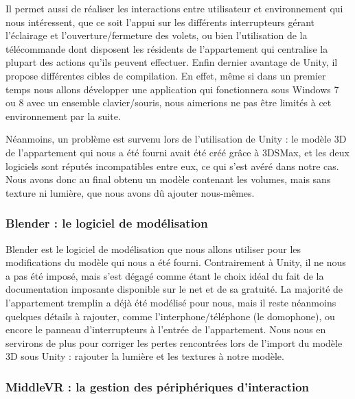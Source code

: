 Il permet aussi de réaliser les interactions entre utilisateur et environnement qui nous intéressent, que ce soit l'appui sur les différents interrupteurs gérant l'éclairage et l'ouverture/fermeture des volets, ou bien l'utilisation de la télécommande dont disposent les résidents de l'appartement qui centralise la plupart des actions qu'ils peuvent effectuer.
Enfin dernier avantage de Unity, il propose différentes cibles de compilation. En effet, même si dans un premier temps nous allons développer une application qui fonctionnera sous Windows 7 ou 8 avec un ensemble clavier/souris, nous aimerions ne pas être limités à cet environnement par la suite. \newline

Néanmoins, un problème est survenu lors de l'utilisation de Unity : le modèle 3D de l'appartement qui nous a été fourni avait été créé grâce à 3DSMax, et les deux logiciels sont réputés incompatibles entre eux, ce qui s'est avéré dans notre cas. Nous avons donc au final obtenu un modèle contenant les volumes, mais sans texture ni lumière, que nous avons dû ajouter nous-mêmes. 

\subsubsection{Blender : le logiciel de modélisation}
Blender est le logiciel de modélisation que nous allons utiliser pour les modifications du modèle qui nous a été fourni. Contrairement à Unity, il ne nous a pas été imposé, mais s'est dégagé comme étant le choix idéal du fait de la documentation imposante disponible sur le net et de sa gratuité.\newline
La majorité de l'appartement tremplin a déjà été modélisé pour nous, mais il reste néanmoins quelques détails à rajouter, comme l'interphone/téléphone (le domophone), ou encore le panneau d'interrupteurs à l'entrée de l'appartement. Nous nous en servirons de plus pour corriger les pertes rencontrées lors de l'import du modèle 3D sous Unity : rajouter la lumière et les textures à notre modèle. 

\subsubsection{MiddleVR : la gestion des périphériques d'interaction}

